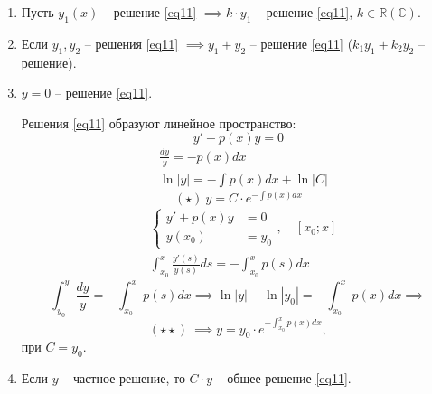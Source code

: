 \begin{note}\leavevmode
    \begin{enumerate}
        \item Пусть $y_1(x)$ -- решение \ref{eq11} $\implies k\cdot y_1$ -- решение \ref{eq11}, $k \in \mathbb{R}(\mathbb{C})$.
        \item Если $y_1,y_2$ -- решения \ref{eq11} $\implies y_1 + y_2$ -- решение \ref{eq11} ($k_1y_1 + k_2y_2$ -- решение).
        \item $y=0$ -- решение \ref{eq11}.
              \begin{statement}
                  Решения \ref{eq11} образуют линейное пространство:
                  \[
                      y' + p(x)y = 0
                  \]
                  \begin{align*}
                       & \frac{dy}{y} = -p(x)dx         \\
                       & \ln|y| = -\int p(x)dx + \ln|C|
                  \end{align*}
                  \[
                      (\star) \ y = C \cdot e^{-\int p(x)dx}
                  \]
                  \begin{align*}
                       & \left\{\begin{array}{rl}
                                    y' + p(x)y & = 0   \\
                                    y(x_0)     & = y_0
                                \end{array}\right., \quad [x_0;x]                   \\
                       & \int_{x_0}^{x}\frac{y'(s)}{y(s)}ds = -\int_{x_0}^{x}p(s)dx
                  \end{align*}
                  \[
                      \int_{y_0}^{y}\frac{dy}{y} = -\int_{x_0}^{x}p(s)dx \implies \ln|y| - \ln|y_0| = - \int_{x_0}^{x}p(x)dx \implies
                  \]
                  \[
                      (\star\star) \ \implies y = y_0\cdot e^{-\int_{x_0}^{x}p(x)dx},
                  \]
                  при $C = y_0$.
              \end{statement}
        \item Если $y$ -- частное решение, то $C \cdot y$ -- общее решение \ref{eq11}.
    \end{enumerate}
\end{note}